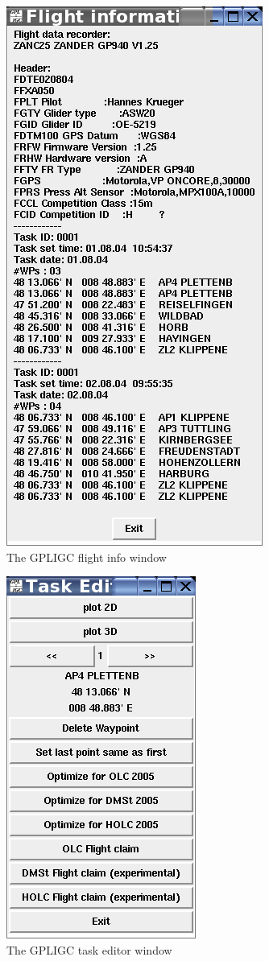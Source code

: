 \begin{figure}[h]
\caption{\label{flightinfo}The GPLIGC flight info window}
\begin{center}
\includegraphics{png/flightinfo}
\end{center}
\end{figure}

\begin{figure}[h]
\caption{\label{taskeditor}The GPLIGC task editor window}
\begin{center}
\includegraphics{png/taskeditor}
\end{center}
\end{figure}

